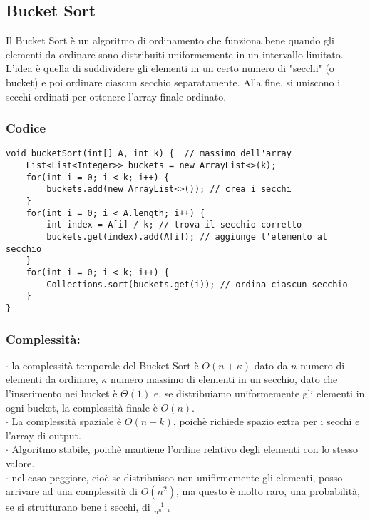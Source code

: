 \documentclass[a4paper,12pt]{article}
\begin{document}
\subsection{Bucket Sort}
Il Bucket Sort è un algoritmo di ordinamento che funziona bene quando gli elementi da ordinare sono distribuiti uniformemente in un intervallo limitato. \\
L'idea è quella di suddividere gli elementi in un certo numero di "secchi" (o bucket) e poi ordinare ciascun secchio separatamente. Alla fine, si uniscono i secchi ordinati per ottenere l'array finale ordinato. \\

\subsubsection{\textcolor{codice}{Codice}}
\begin{lstlisting}[style=mystyle]
void bucketSort(int[] A, int k) {  // massimo dell'array
    List<List<Integer>> buckets = new ArrayList<>(k);
    for(int i = 0; i < k; i++) {
        buckets.add(new ArrayList<>()); // crea i secchi
    }
    for(int i = 0; i < A.length; i++) {
        int index = A[i] / k; // trova il secchio corretto
        buckets.get(index).add(A[i]); // aggiunge l'elemento al secchio
    }
    for(int i = 0; i < k; i++) {
        Collections.sort(buckets.get(i)); // ordina ciascun secchio
    }
}
\end{lstlisting}




\subsubsection*{\textcolor{teorema}{Complessità:}}
$\cdot $ la complessità temporale del Bucket Sort è $O(n + \kappa)$ dato da $n$ numero di elementi da ordinare, $\kappa$ numero massimo di elementi in un secchio, dato che l'inserimento nei bucket è $\Theta(1)$ e, se distribuiamo uniformemente gli elementi in ogni bucket, la complessità finale è $O(n)$. \\
$\cdot $ La complessità spaziale è $O(n + k)$, poichè richiede spazio extra per i secchi e l'array di output. \\
$\cdot $ Algoritmo stabile, poichè mantiene l'ordine relativo degli elementi con lo stesso valore. \\
$\cdot $ nel caso peggiore, cioè se distribuisco non unifirmemente gli elementi, posso arrivare ad una complessità di $O(n^2)$, ma questo è molto raro, una probabilità, se si strutturano bene i secchi, di $\frac{1}{n^{n-1}}$  \\
\end{document}
